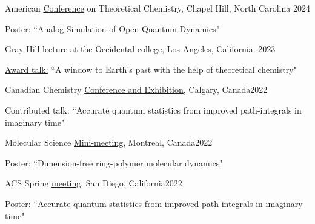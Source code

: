 \documentclass[margin,line]{res}
\newenvironment{list1}{
  \begin{list}{\ding{113}}{%
      \setlength{\itemsep}{0in}
      \setlength{\parsep}{0in} \setlength{\parskip}{0in}
      \setlength{\topsep}{0in} \setlength{\partopsep}{0in} 
      \setlength{\leftmargin}{0.17in}}}{\end{list}}
\begin{document}
\begin{resume}
American \href{https://www.actc2024.org/}{Conference} on Theoretical Chemistry, Chapel Hill, North Carolina \hfill{2024}

\begin{list1}
\item[]Poster: ``Analog Simulation of Open Quantum Dynamics"
\end{list1}

\vspace*{-2mm}

\href{https://www.oxy.edu/academics/student-research/urc/2023-summer-research-program}{Gray-Hill} lecture at the Occidental college, Los Angeles, California.  \hfill{2023}

\begin{list1}
\item[]\underline{Award talk:} ``A window to Earth's past with the help of theoretical chemistry"
\end{list1}

\vspace*{-2mm}

Canadian Chemistry \href{https://www.cheminst.ca/conference/canadian-chemistry-conference-and-exhibition/}{Conference and Exhibition}, Calgary, Canada\hfill {2022}

\begin{list1}
\item[]Contributed talk: ``Accurate quantum statistics from improved path-integrals in imaginary time" 
\end{list1}
\vspace*{-2mm}

Molecular Science \href{https://www.siminegroup.ca/mms/mms2022}{Mini-meeting}, Montreal, Canada\hfill{2022}

\begin{list1}
\item[]Poster: ``Dimension-free ring-polymer molecular dynamics"
\end{list1}

\vspace*{-2mm}

ACS Spring \href{https://www.morressier.com/o/event/623377e0b300ee00119b311f}{meeting}, San Diego, California\hfill{2022}

\begin{list1}
\item[]Poster: ``Accurate quantum statistics from improved path-integrals in imaginary time"
\end{list1}

\vspace*{-2mm}


\end{resume}
\end{document}
